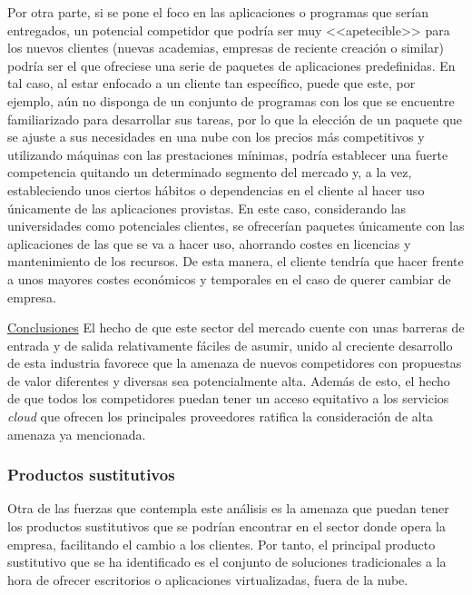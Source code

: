 Por otra parte, si se pone el foco en las aplicaciones o programas que serían entregados, un potencial competidor que podría ser muy <<apetecible>> para los nuevos clientes (nuevas academias, empresas de reciente creación o similar) podría ser el que ofreciese una serie de paquetes de aplicaciones predefinidas. En tal caso, al estar enfocado a un cliente tan específico, puede que este, por ejemplo, aún no disponga de un conjunto de programas con los que se encuentre familiarizado para desarrollar sus tareas, por lo que la elección de un paquete que se ajuste a sus necesidades en una nube con los precios más competitivos y utilizando máquinas con las prestaciones mínimas, podría establecer una fuerte competencia quitando un determinado segmento del mercado y, a la vez, estableciendo unos ciertos hábitos o dependencias en el cliente al hacer uso únicamente de las aplicaciones provistas. En este caso, considerando las universidades como potenciales clientes, se ofrecerían paquetes únicamente con las aplicaciones de las que se va a hacer uso, ahorrando costes en licencias y mantenimiento de los recursos. De esta manera, el cliente tendría que hacer frente a unos mayores costes económicos y temporales en el caso de querer cambiar de empresa.

\noindent\underline{Conclusiones}\newline
\indent El hecho de que este sector del mercado cuente con unas barreras de entrada y de salida relativamente fáciles de asumir, unido al creciente desarrollo de esta industria favorece que la amenaza de nuevos competidores con propuestas de valor diferentes y diversas sea potencialmente alta. Además de esto, el hecho de que todos los competidores puedan tener un acceso equitativo a los servicios \textit{cloud} que ofrecen los principales proveedores ratifica la consideración de alta amenaza ya mencionada. 

\clearpage


\subsubsection{Productos sustitutivos}
Otra de las fuerzas que contempla este análisis es la amenaza que puedan tener los productos sustitutivos que se podrían encontrar en el sector donde opera la empresa, facilitando el cambio a los clientes. Por tanto, el principal producto sustitutivo que se ha identificado es el conjunto de soluciones tradicionales a la hora de ofrecer escritorios o aplicaciones virtualizadas, fuera de la nube.

